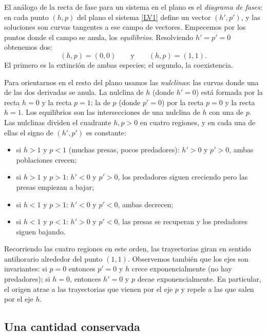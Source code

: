 \documentclass[12pt, a4paper]{amsbook}
\theoremstyle{remark}
\theoremstyle{definition}
\numberwithin{section}{chapter}
\numberwithin{subsection}{section}
\numberwithin{equation}{section}
\numberwithin{figure}{chapter}
\begin{document}
El análogo de la recta de fase para un sistema en el plano es el \emph{diagrama de fases}: en cada punto $(h,p)$ del plano el sistema \eqref{LV1} define un vector $(h',p')$, y las soluciones son curvas tangentes a ese campo de vectores. Empecemos por los puntos donde el campo se anula, los \emph{equilibrios}. Resolviendo $h'=p'=0$ obtenemos dos:
$$
(h,p)=(0,0)\qquad \text{y}\qquad (h,p)=(1,1).
$$
El primero es la extinción de ambas especies; el segundo, la coexistencia.

Para orientarnos en el resto del plano usamos las \emph{nulclinas}: las curvas donde una de las dos derivadas se anula. La nulclina de $h$ (donde $h'=0$) está formada por la recta $h=0$ y la recta $p=1$; la de $p$ (donde $p'=0$) por la recta $p=0$ y la recta $h=1$. Los equilibrios son las intersecciones de una nulclina de $h$ con una de $p$. Las nulclinas dividen el cuadrante $h,p>0$ en cuatro regiones, y en cada una de ellas el signo de $(h',p')$ es constante:
\begin{itemize}
\item si $h>1$ y $p<1$ (muchas presas, pocos predadores): $h'>0$ y $p'>0$, ambas poblaciones crecen;
\item si $h>1$ y $p>1$: $h'<0$ y $p'>0$, los predadores siguen creciendo pero las presas empiezan a bajar;
\item si $h<1$ y $p>1$: $h'<0$ y $p'<0$, ambas decrecen;
\item si $h<1$ y $p<1$: $h'>0$ y $p'<0$, las presas se recuperan y los predadores siguen bajando.
\end{itemize}
Recorriendo las cuatro regiones en este orden, las trayectorias giran en sentido antihorario alrededor del punto $(1,1)$. Observemos también que los ejes son invariantes: si $p=0$ entonces $p'=0$ y $h$ crece exponencialmente (no hay predadores); si $h=0$, entonces $h'=0$ y $p$ decae exponencialmente. En particular, el origen atrae a las trayectorias que vienen por el eje $p$ y repele a las que salen por el eje $h$.

\subsection{Una cantidad conservada}
\end{document}
